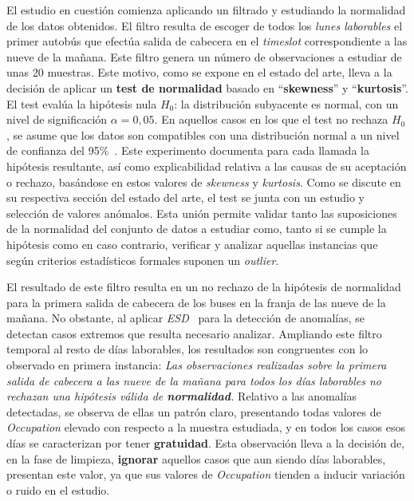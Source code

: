 El estudio en cuestión comienza aplicando un filtrado y estudiando la normalidad de los datos
obtenidos. El filtro resulta de escoger de todos los \textit{lunes laborables} el primer autobús que efectúa
salida de cabecera en el \textit{timeslot} correspondiente a las nueve de la mañana. Este filtro
genera un número de observaciones a estudiar de unas 20 muestras. Este motivo, como se expone en el 
estado del arte, lleva a la decisión de aplicar un \textbf{test de normalidad} basado en 
\enquote{\textbf{skewness}} y \enquote{\textbf{kurtosis}}. El test evalúa la hipótesis nula $H_0$: la 
distribución subyacente es normal, con un nivel de significación $\alpha = 0{,}05$. En aquellos casos en 
los que el test no rechaza $H_0$, se asume que los datos son compatibles con una distribución normal a 
un nivel de confianza del 95\%~\cite{kim2013normality}. Este experimento documenta
para cada llamada la hipótesis resultante, así como explicabilidad relativa a las causas de su aceptación o 
rechazo, basándose en estos valores de \textit{skewness} y \textit{kurtosis}. Como se discute en su
respectiva sección del estado del arte, el test se junta con un estudio y selección de valores anómalos.
Esta unión permite validar tanto las suposiciones de la normalidad del conjunto de datos a estudiar como,
 tanto si se cumple la hipótesis como en caso contrario, verificar y analizar aquellas instancias que según
 criterios estadísticos formales suponen un \textit{outlier}.

El resultado de este filtro resulta en un no rechazo de la hipótesis de normalidad para la primera salida 
de cabecera de los buses en la franja de las nueve de la mañana. No obstante, al aplicar \textit{ESD}~\cite{rosner1983} para
la detección de anomalías, se detectan casos extremos que resulta necesario analizar. Ampliando este filtro
temporal al resto de días laborables, los resultados son congruentes con lo observado en primera instancia:
\textit{Las observaciones realizadas sobre la primera salida de cabecera a las nueve de la mañana
para todos los días laborables no rechazan una hipótesis válida de \textbf{normalidad}.} Relativo a las anomalías detectadas, 
se observa de ellas
un patrón claro, presentando todas valores de \textit{Occupation} elevado con respecto a la muestra estudiada,
y en todos los casos esos días se caracterizan por tener \textbf{gratuidad}. Esta observación lleva a la decisión de, en 
la fase de limpieza, \textbf{ignorar} aquellos casos que aun siendo días laborables, presentan este valor, ya que sus valores
de \textit{Occupation} tienden a inducir variación o ruido en el estudio.

